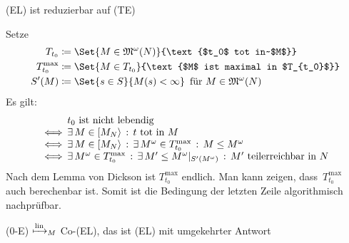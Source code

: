 \documentclass{cheat-sheet}
\newcommand{\activeTransition}[1]{[{#1}\rangle} %
\newcommand{\ExtMarkings}{\mathfrak{M}^\omega} %
\newcommand{\reducesManyOneToLin}{\xmapsto{\mathrm{lin}}_M} %
\begin{document}
\begin{satz}
  (EL) ist reduzierbar auf (TE)
\end{satz}

\begin{beweisidee}
  Setze
  \begin{align*}
    T_{t_0} & \coloneqq \Set{M \in \ExtMarkings(N)}{\text{$t_0$ tot in~$M$}} \\
    T_{t_0}^{\mathrm{max}} & \coloneqq \Set{M \in T_{t_0}}{\text{$M$ ist maximal in $T_{t_0}$}} \\
    S'(M) & \coloneqq \Set{s \in S}{M(s) < \infty} \enspace \text{für $M \in \ExtMarkings(N)$}
  \end{align*}
  Es gilt:
  \[
    \arraycolsep=1pt
    \begin{array}{l l}
      & t_0 \text{ ist nicht lebendig} \\
      \iff & \ex{M \in \activeTransition{M_N}} t \text{ tot in~$M$} \\
      \iff & \ex{M \in \activeTransition{M_N}} \ex{M^\omega \in T_{t_0}^{\mathrm{max}}} M \leq M^\omega \\
      \iff & \ex{M^\omega \in T_{t_0}^{\mathrm{max}}} \ex{M' \leq M^\omega|_{S'(M^\omega)}} M' \text{ teilerreichbar in } N
    \end{array}
  \]
  Nach dem Lemma von Dickson ist $T_{t_0}^{\mathrm{max}}$ endlich.
  Man kann zeigen, dass~$T_{t_0}^{\mathrm{max}}$ auch berechenbar ist.
  Somit ist die Bedingung der letzten Zeile algorithmisch nachprüfbar.
\end{beweisidee}

\begin{satz}
  (0-E) $\reducesManyOneToLin$ Co-(EL), das ist (EL) mit umgekehrter Antwort
\end{satz}
\end{document}
